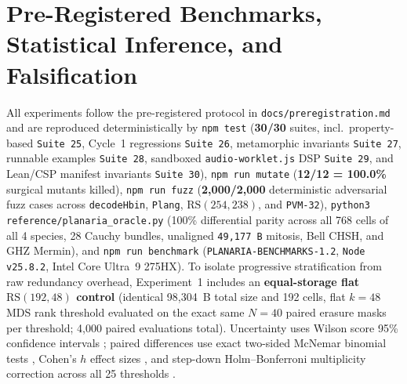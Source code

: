 \documentclass[11pt,letterpaper]{article}
\theoremstyle{remark}
\begin{document}
\section{Pre-Registered Benchmarks, Statistical Inference, and Falsification}
\label{sec:bench}

All experiments follow the pre-registered protocol in \texttt{docs/preregistration.md} and are reproduced deterministically by \texttt{npm test} (\textbf{30/30} suites, incl.\ property-based \texttt{Suite 25}, Cycle~1 regressions \texttt{Suite 26}, metamorphic invariants \texttt{Suite 27}, runnable examples \texttt{Suite 28}, sandboxed \texttt{audio-worklet.js} DSP \texttt{Suite 29}, and Lean/CSP manifest invariants \texttt{Suite 30}), \texttt{npm run mutate} (\textbf{12/12 = 100.0\%} surgical mutants killed), \texttt{npm run fuzz} (\textbf{2,000/2,000} deterministic adversarial fuzz cases across \texttt{decodeHbin}, \texttt{Plang}, $\mathrm{RS}(254,238)$, and \texttt{PVM-32}), \texttt{python3 reference/planaria\_oracle.py} (100\% differential parity across all 768 cells of all 4 species, 28 Cauchy bundles, unaligned \texttt{49,177 B} mitosis, Bell CHSH, and GHZ Mermin), and \texttt{npm run benchmark} (\texttt{PLANARIA-BENCHMARKS-1.2}, \texttt{Node v25.8.2}, Intel Core Ultra~9 275HX). To isolate progressive stratification from raw redundancy overhead, Experiment~1 includes an \textbf{equal-storage flat $\mathrm{RS}(192,48)$ control} (identical 98,304~B total size and 192 cells, flat $k=48$ MDS rank threshold evaluated on the exact same $N=40$ paired erasure masks per threshold; 4,000 paired evaluations total). Uncertainty uses Wilson score 95\% confidence intervals \cite{wilson1927}; paired differences use exact two-sided McNemar binomial tests \cite{mcnemar1947}, Cohen's $h$ effect sizes \cite{cohen1988}, and step-down Holm--Bonferroni multiplicity correction across all 25 thresholds \cite{holm1979}.
\end{document}
